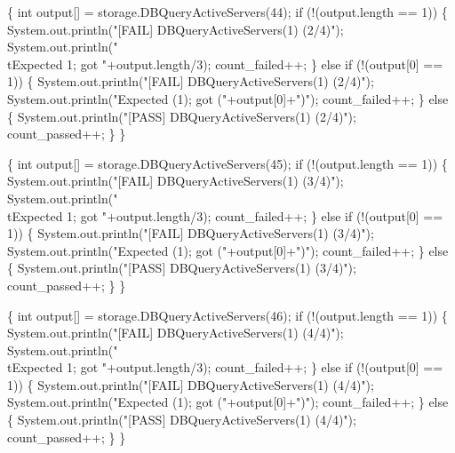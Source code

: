 \documentclass{article}
\def\nwendcode{\endtrivlist \endgroup}
\let\nwdocspar=\par
\begin{document}
\{
  int output[] = storage.DBQueryActiveServers(44);
  if (!(output.length == 1)) \{
    System.out.println("[FAIL] DBQueryActiveServers(1) (2/4)");
    System.out.println("\\tExpected 1; got "+output.length/3);
    count_failed++;
  \} else if (!(output[0] == 1)) \{
    System.out.println("[FAIL] DBQueryActiveServers(1) (2/4)");
    System.out.println("Expected (1); got ("+output[0]+")");
    count_failed++;
  \} else \{
    System.out.println("[PASS] DBQueryActiveServers(1) (2/4)");
    count_passed++;
  \}
\}
\nwendcode{}\nwdocspar
\nwenddocs{}\endmoddef{}
\{
  int output[] = storage.DBQueryActiveServers(45);
  if (!(output.length == 1)) \{
    System.out.println("[FAIL] DBQueryActiveServers(1) (3/4)");
    System.out.println("\\tExpected 1; got "+output.length/3);
    count_failed++;
  \} else if (!(output[0] == 1)) \{
    System.out.println("[FAIL] DBQueryActiveServers(1) (3/4)");
    System.out.println("Expected (1); got ("+output[0]+")");
    count_failed++;
  \} else \{
    System.out.println("[PASS] DBQueryActiveServers(1) (3/4)");
    count_passed++;
  \}
\}
\nwendcode{}\nwdocspar
\nwenddocs{}\endmoddef{}
\{
  int output[] = storage.DBQueryActiveServers(46);
  if (!(output.length == 1)) \{
    System.out.println("[FAIL] DBQueryActiveServers(1) (4/4)");
    System.out.println("\\tExpected 1; got "+output.length/3);
    count_failed++;
  \} else if (!(output[0] == 1)) \{
    System.out.println("[FAIL] DBQueryActiveServers(1) (4/4)");
    System.out.println("Expected (1); got ("+output[0]+")");
    count_failed++;
  \} else \{
    System.out.println("[PASS] DBQueryActiveServers(1) (4/4)");
    count_passed++;
  \}
\}
\nwendcode{}\nwdocspar
\end{document}
